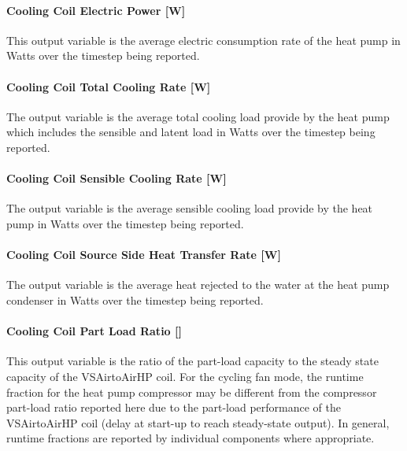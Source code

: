\paragraph{Cooling Coil Electric Power {[}W{]}}\label{cooling-coil-electric-power-w-1}

This output variable is the average electric consumption rate of the heat pump in Watts over the timestep being reported.

\paragraph{Cooling Coil Total Cooling Rate {[}W{]}}\label{cooling-coil-total-cooling-rate-w-5}

The output variable is the average total cooling load provide by the heat pump which includes the sensible and latent load in Watts over the timestep being reported.

\paragraph{Cooling Coil Sensible Cooling Rate {[}W{]}}\label{cooling-coil-sensible-cooling-rate-w-5}

The output variable is the average sensible cooling load provide by the heat pump in Watts over the timestep being reported.

\paragraph{Cooling Coil Source Side Heat Transfer Rate {[}W{]}}\label{cooling-coil-source-side-heat-transfer-rate-w}

The output variable is the average heat rejected to the water at the heat pump condenser in Watts over the timestep being reported.

\paragraph{\texorpdfstring{Cooling Coil Part Load Ratio {[]}}{Cooling Coil Part Load Ratio }}\label{cooling-coil-part-load-ratio}

This output variable is the ratio of the part-load capacity to the steady state capacity of the VSAirtoAirHP coil. For the cycling fan mode, the runtime fraction for the heat pump compressor may be different from the compressor part-load ratio reported here due to the part-load performance of the VSAirtoAirHP coil (delay at start-up to reach steady-state output). In general, runtime fractions are reported by individual components where appropriate.

